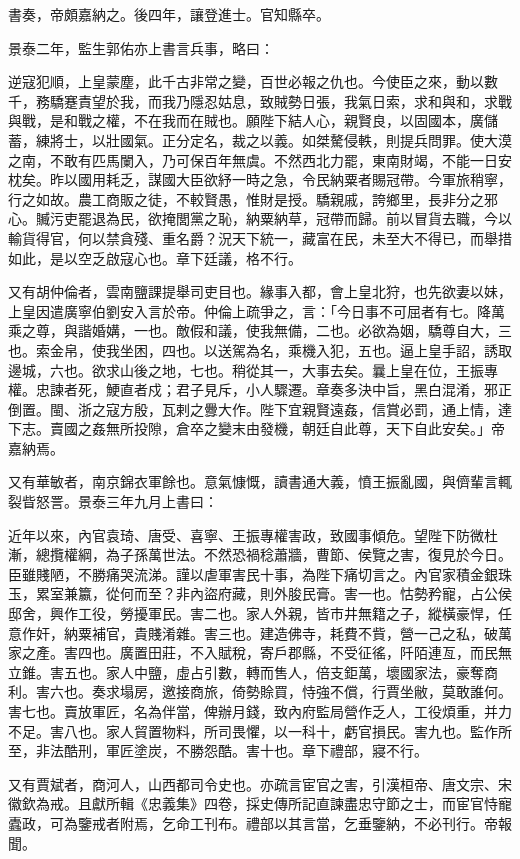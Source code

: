 \begin{pinyinscope}
書奏，帝頗嘉納之。後四年，讓登進士。官知縣卒。

景泰二年，監生郭佑亦上書言兵事，略曰：

逆寇犯順，上皇蒙塵，此千古非常之變，百世必報之仇也。今使臣之來，動以數千，務驕蹇責望於我，而我乃隱忍姑息，致賊勢日張，我氣日索，求和與和，求戰與戰，是和戰之權，不在我而在賊也。願陛下結人心，親賢良，以固國本，廣儲蓄，練將士，以壯國氣。正分定名，裁之以義。如桀驁侵軼，則提兵問罪。使大漠之南，不敢有匹馬闌入，乃可保百年無虞。不然西北力罷，東南財竭，不能一日安枕矣。昨以國用耗乏，謀國大臣欲紓一時之急，令民納粟者賜冠帶。今軍旅稍寧，行之如故。農工商販之徒，不較賢愚，惟財是授。驕親戚，誇鄉里，長非分之邪心。贓污吏罷退為民，欲掩閭黨之恥，納粟納草，冠帶而歸。前以冒貨去職，今以輸貨得官，何以禁貪殘、重名爵？況天下統一，藏富在民，未至大不得已，而舉措如此，是以空乏啟寇心也。章下廷議，格不行。

又有胡仲倫者，雲南鹽課提舉司吏目也。緣事入都，會上皇北狩，也先欲妻以妹，上皇因遣廣寧伯劉安入言於帝。仲倫上疏爭之，言：「今日事不可屈者有七。降萬乘之尊，與諧婚媾，一也。敵假和議，使我無備，二也。必欲為姻，驕尊自大，三也。索金帛，使我坐困，四也。以送駕為名，乘機入犯，五也。逼上皇手詔，誘取邊城，六也。欲求山後之地，七也。稍從其一，大事去矣。曩上皇在位，王振專權。忠諫者死，鯁直者戍；君子見斥，小人驟遷。章奏多決中旨，黑白混淆，邪正倒置。閩、浙之寇方殷，瓦剌之釁大作。陛下宜親賢遠姦，信賞必罰，通上情，達下志。賣國之姦無所投隙，倉卒之變末由發機，朝廷自此尊，天下自此安矣。」帝嘉納焉。

又有華敏者，南京錦衣軍餘也。意氣慷慨，讀書通大義，憤王振亂國，與儕輩言輒裂眥怒詈。景泰三年九月上書曰：

近年以來，內官袁琦、唐受、喜寧、王振專權害政，致國事傾危。望陛下防微杜漸，總攬權綱，為子孫萬世法。不然恐禍稔蕭牆，曹節、侯覽之害，復見於今日。臣雖賤陋，不勝痛哭流涕。謹以虐軍害民十事，為陛下痛切言之。內官家積金銀珠玉，累室兼籝，從何而至？非內盜府藏，則外朘民膏。害一也。怙勢矜寵，占公侯邸舍，興作工役，勞擾軍民。害二也。家人外親，皆市井無籍之子，縱橫豪悍，任意作奸，納粟補官，貴賤淆雜。害三也。建造佛寺，耗費不貲，營一己之私，破萬家之產。害四也。廣置田莊，不入賦稅，寄戶郡縣，不受征徭，阡陌連亙，而民無立錐。害五也。家人中鹽，虛占引數，轉而售人，倍支鉅萬，壞國家法，豪奪商利。害六也。奏求塌房，邀接商旅，倚勢賒買，恃強不償，行賈坐敝，莫敢誰何。害七也。賣放軍匠，名為伴當，俾辦月錢，致內府監局營作乏人，工役煩重，并力不足。害八也。家人貿置物料，所司畏懼，以一科十，虧官損民。害九也。監作所至，非法酷刑，軍匠塗炭，不勝怨酷。害十也。章下禮部，寢不行。

又有賈斌者，商河人，山西都司令史也。亦疏言宦官之害，引漢桓帝、唐文宗、宋徽欽為戒。且獻所輯《忠義集》四卷，採史傳所記直諫盡忠守節之士，而宦官恃寵蠹政，可為鑒戒者附焉，乞命工刊布。禮部以其言當，乞垂鑒納，不必刊行。帝報聞。


\end{pinyinscope}
